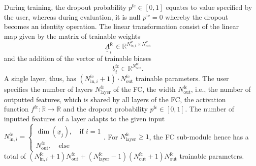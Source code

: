 During training,
the dropout probability $p^\text{fc} \in [0,1]$ equates to value specified by the user,
whereas during evaluation,
it is null $p^\text{fc} = 0$
whereby the dropout becomes an identity operation.
The linear transformation
consist of the linear map given by the matrix of trainable weights
\begin{equation}
    \underline{\underline A}^\text{fc}_i 
    \in 
    \mathbb{R}^{
        N^\text{fc}_{\text{in}, i}
        \times
        N^\text{fc}_\text{out}
    }
\end{equation}
and the addition of the vector of trainable biases
\begin{equation}
    \underline b^\text{fc}_i 
    \in \mathbb{R}^{
        N^\text{fc}_\text{out}
    }.
\end{equation}
A single layer, thus,
has
$
    \left(
        N^\text{fc}_{\text{in}, i} + 1
    \right)
    \cdot
    N^\text{fc}_\text{out}
$
trainable parameters.
The user specifies the number of layers
$
    N^\text{fc}_\text{layer}
$
of the FC, the width 
$
    N^\text{fc}_\text{out}
$,
i.e., the number of outputted features,
which is shared by all layers of the FC,
the activation function 
$
    f^\text{fc}: \mathbb{R} \rightarrow \mathbb{R}
$
and the dropout probability
$
    p^\text{fc} \in [0,1]
$.
The number of inputted features
of a layer
adapts to the given input
$
    N^\text{fc}_{\text{in}, i} 
    = 
    \begin{cases}
        \dim \left(
            \underline{x}_j
        \right)
        ,\quad 
        \text{if } i = 1
        \\
        N^\text{fc}_\text{out}
        ,\quad 
        \text{else} 
    \end{cases}
$.
For 
$
    N^\text{fc}_\text{layer} \ge 1
$,
the FC sub-module hence has
a total of 
$
    \left(
        N^\text{fc}_{\text{in}, i} + 1
    \right)
    N^\text{fc}_\text{out}
    +
    \left(
        N^\text{fc}_\text{layer} - 1
    \right)
    \left(
        N^\text{fc}_\text{out} + 1
    \right)
    N^\text{fc}_\text{out}
$
trainable parameters.

